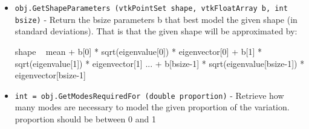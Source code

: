 \begin{itemize}
\item  \verb|obj.GetShapeParameters (vtkPointSet shape, vtkFloatArray b, int bsize)| -  Return the bsize parameters b that best model the given shape
 (in standard deviations). 
 That is that the given shape will be approximated by:

 shape ~ mean + b[0] * sqrt(eigenvalue[0]) * eigenvector[0]
              + b[1] * sqrt(eigenvalue[1]) * eigenvector[1]
         ...
              + b[bsize-1] * sqrt(eigenvalue[bsize-1]) * eigenvector[bsize-1]

\item  \verb|int = obj.GetModesRequiredFor (double proportion)| -  Retrieve how many modes are necessary to model the given proportion of the variation.
 proportion should be between 0 and 1

\end{itemize}
